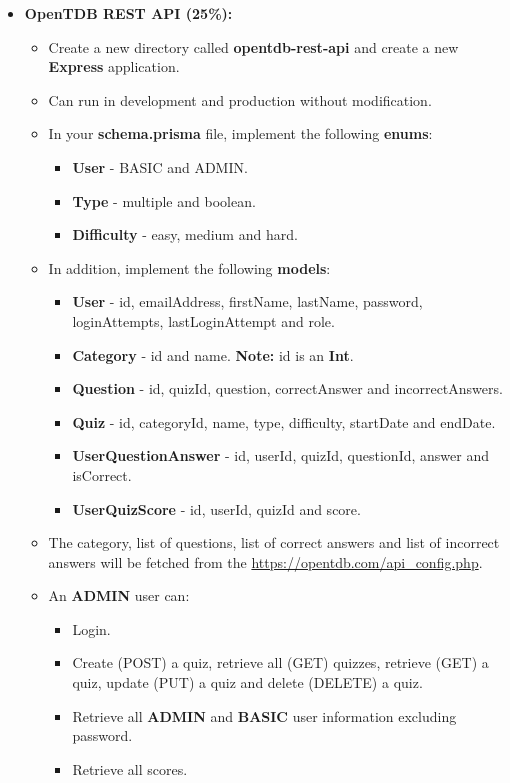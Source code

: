 \documentclass{article}
\begin{document}
\begin{itemize}
	\item \textbf{OpenTDB REST API (25\%):}
	\begin{itemize}
		\item Create a new directory called \textbf{opentdb-rest-api} and create a new \textbf{Express} application.
		\item Can run in development and production without modification.
		\item In your \textbf{schema.prisma} file, implement the following \textbf{enums}:
		\begin{itemize}
			\item \textbf{User} - BASIC and ADMIN.
			\item \textbf{Type} - multiple and boolean.
			\item \textbf{Difficulty} - easy, medium and hard.
		\end{itemize}
		\item In addition, implement the following \textbf{models}:
		\begin{itemize}
			\item \textbf{User} - id, emailAddress, firstName, lastName, password, loginAttempts, lastLoginAttempt and role.
			\item \textbf{Category} - id and name. \textbf{Note:} id is an \textbf{Int}.
			\item \textbf{Question} - id, quizId, question, correctAnswer and incorrectAnswers.
			\item \textbf{Quiz} - id, categoryId, name, type, difficulty, startDate and endDate.
			\item \textbf{UserQuestionAnswer} - id, userId, quizId, questionId, answer and isCorrect.
			\item \textbf{UserQuizScore} - id, userId, quizId and score.
		\end{itemize}
		\item The category, list of questions, list of correct answers and list of incorrect answers will be fetched from the \href{OpenTDB API}{https://opentdb.com/api\_config.php}.
		\item An \textbf{ADMIN} user can:
		\begin{itemize}
			\item Login.
			\item Create (POST) a quiz, retrieve all (GET) quizzes, retrieve (GET) a quiz, update (PUT) a quiz and delete (DELETE) a quiz.  	
			\item Retrieve all \textbf{ADMIN} and \textbf{BASIC} user information excluding password.
			\item Retrieve all scores.

\end{itemize}
\end{itemize}
\end{itemize}
\end{document}
